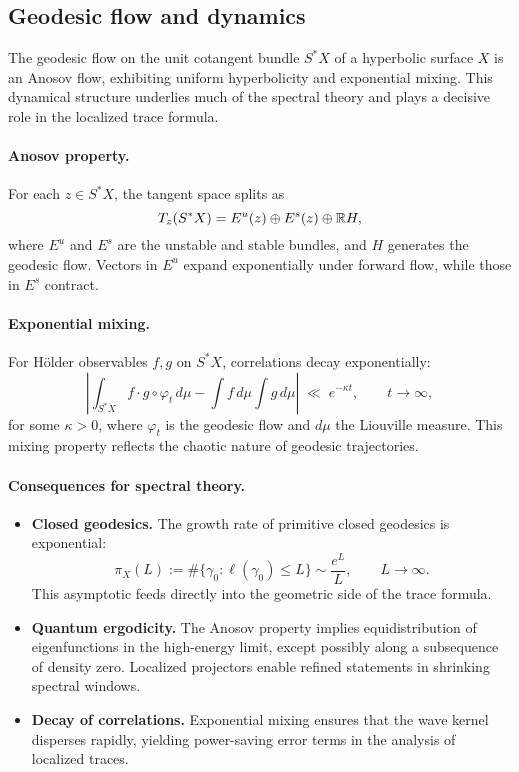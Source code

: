 \subsection{Geodesic flow and dynamics}\label{subsec:flow}

The geodesic flow on the unit cotangent bundle $S^*X$ of a hyperbolic surface $X$ is 
an Anosov flow, exhibiting uniform hyperbolicity and exponential mixing.  
This dynamical structure underlies much of the spectral theory and plays a decisive role 
in the localized trace formula.

\paragraph{Anosov property.}
For each $z\in S^*X$, the tangent space splits as
\[
  T_z(S^*X) = E^u(z) \oplus E^s(z) \oplus \mathbb{R} H,
\]
where $E^u$ and $E^s$ are the unstable and stable bundles, and $H$ generates the geodesic flow.  
Vectors in $E^u$ expand exponentially under forward flow, while those in $E^s$ contract.

\paragraph{Exponential mixing.}
For Hölder observables $f,g$ on $S^*X$, correlations decay exponentially:
\[
  \left|\int_{S^*X} f \cdot g\circ\varphi_t \, d\mu - \int f\,d\mu \int g\,d\mu \right|
  \;\ll\; e^{-\kappa t}, \qquad t\to\infty,
\]
for some $\kappa>0$, where $\varphi_t$ is the geodesic flow and $d\mu$ the Liouville measure.
This mixing property reflects the chaotic nature of geodesic trajectories.

\paragraph{Consequences for spectral theory.}
\begin{itemize}
  \item \textbf{Closed geodesics.}  
        The growth rate of primitive closed geodesics is exponential:
        \[
          \pi_X(L) := \#\{\gamma_0 : \ell(\gamma_0)\le L\} \sim \frac{e^L}{L}, \qquad L\to\infty.
        \]
        This asymptotic feeds directly into the geometric side of the trace formula.
  \item \textbf{Quantum ergodicity.}  
        The Anosov property implies equidistribution of eigenfunctions in the high-energy limit, 
        except possibly along a subsequence of density zero.  
        Localized projectors enable refined statements in shrinking spectral windows.
  \item \textbf{Decay of correlations.}  
        Exponential mixing ensures that the wave kernel disperses rapidly, 
        yielding power-saving error terms in the analysis of localized traces.
\end{itemize}


